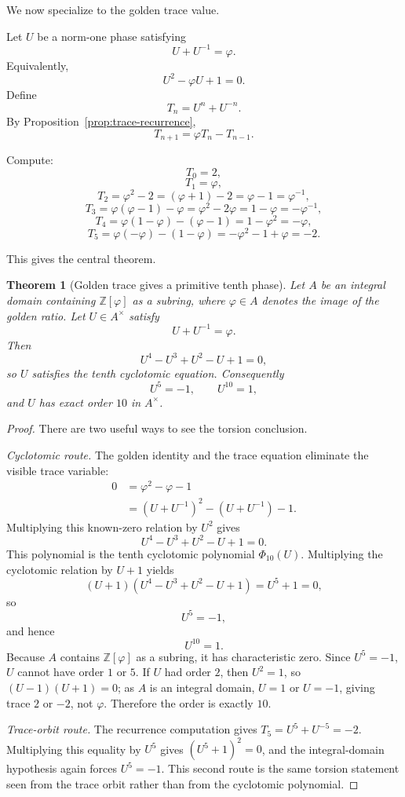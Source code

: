 \documentclass[11pt]{article}
\newtheorem{theorem}[definition]{Theorem}
\newcommand{\ph}{\varphi}
\newcommand{\Z}{\mathbb{Z}}
\begin{document}
We now specialize to the golden trace value.

Let $U$ be a norm-one phase satisfying
\[
    U+U^{-1}=\ph.
\]
Equivalently,
\[
    U^2-\ph U+1=0.
\]
Define
\[
    T_n=U^n+U^{-n}.
\]
By Proposition~\ref{prop:trace-recurrence},
\[
    T_{n+1}=\ph T_n-T_{n-1}.
\]

Compute:
\[
    T_0=2,
\]
\[
    T_1=\ph,
\]
\[
    T_2=\ph^2-2=(\ph+1)-2=\ph-1=\ph^{-1},
\]
\[
    T_3=\ph(\ph-1)-\ph=\ph^2-2\ph=1-\ph=-\ph^{-1},
\]
\[
    T_4=\ph(1-\ph)-(\ph-1)=1-\ph^2=-\ph,
\]
\[
    T_5=\ph(-\ph)-(1-\ph)=-\ph^2-1+\ph=-2.
\]

This gives the central theorem.

\begin{theorem}[Golden trace gives a primitive tenth phase]\label{thm:golden-pentagonal}
Let $A$ be an integral domain containing $\Z[\ph]$ as a subring, where $\ph\in A$ denotes the image of the golden ratio.  Let $U\in A^\times$ satisfy
\[
    U+U^{-1}=\ph.
\]
Then
\[
    U^4-U^3+U^2-U+1=0,
\]
so $U$ satisfies the tenth cyclotomic equation.  Consequently
\[
    U^5=-1,
    \qquad
    U^{10}=1,
\]
and $U$ has exact order $10$ in $A^\times$.
\end{theorem}

\begin{proof}
There are two useful ways to see the torsion conclusion.

\textit{Cyclotomic route.}  The golden identity and the trace equation eliminate the visible trace variable:
\begin{align*}
0&=\ph^2-\ph-1\\
  &=(U+U^{-1})^2-(U+U^{-1})-1.
\end{align*}
Multiplying this known-zero relation by $U^2$ gives
\[
    U^4-U^3+U^2-U+1=0.
\]
This polynomial is the tenth cyclotomic polynomial $\Phi_{10}(U)$.  Multiplying the cyclotomic relation by $U+1$ yields
\[
    (U+1)(U^4-U^3+U^2-U+1)=U^5+1=0,
\]
so
\[
    U^5=-1,
\]
and hence
\[
    U^{10}=1.
\]
Because $A$ contains $\Z[\ph]$ as a subring, it has characteristic zero.  Since $U^5=-1$, $U$ cannot have order $1$ or $5$.  If $U$ had order $2$, then $U^2=1$, so $(U-1)(U+1)=0$; as $A$ is an integral domain, $U=1$ or $U=-1$, giving trace $2$ or $-2$, not $\ph$.  Therefore the order is exactly $10$.

\textit{Trace-orbit route.}  The recurrence computation gives $T_5=U^5+U^{-5}=-2$.  Multiplying this equality by $U^5$ gives $(U^5+1)^2=0$, and the integral-domain hypothesis again forces $U^5=-1$.  This second route is the same torsion statement seen from the trace orbit rather than from the cyclotomic polynomial.
\end{proof}
\end{document}
